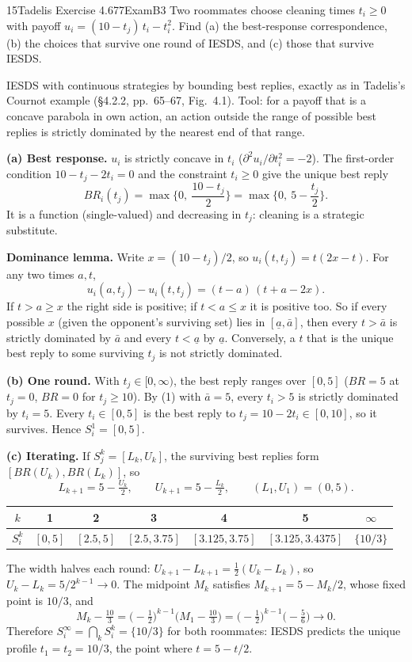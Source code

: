 \begin{exsol}{15}{Tadelis Exercise 4.6}{77}{Exam}{B3}
\asked Two roommates choose cleaning times $t_i \ge 0$ with payoff
$u_i = (10 - t_j)\,t_i - t_i^2$. Find (a) the best-response correspondence, (b) the choices that
survive one round of IESDS, and (c) those that survive IESDS.

\method IESDS with continuous strategies by bounding best replies, exactly as in Tadelis's
Cournot example (\S4.2.2, pp.~65--67, Fig.~4.1). Tool: for a payoff that is a concave parabola
in own action, an action outside the range of possible best replies is strictly dominated by the
nearest end of that range.

\solution
\textbf{(a) Best response.} $u_i$ is strictly concave in $t_i$ ($\partial^2 u_i/\partial t_i^2 = -2$).
The first-order condition $10 - t_j - 2t_i = 0$ and the constraint $t_i \ge 0$ give the unique
best reply
\[
  BR_i(t_j) = \max\Big\{0,\ \frac{10 - t_j}{2}\Big\} = \max\Big\{0,\ 5 - \frac{t_j}{2}\Big\}.
\]
It is a function (single-valued) and decreasing in $t_j$: cleaning is a strategic substitute.

\textbf{Dominance lemma.} Write $x = (10 - t_j)/2$, so $u_i(t, t_j) = t(2x - t)$. For any two
times $a, t$,
\[
  u_i(a, t_j) - u_i(t, t_j) = (t - a)\,(t + a - 2x). \tag{1}
\]
If $t > a \ge x$ the right side is positive; if $t < a \le x$ it is positive too. So if every
possible $x$ (given the opponent's surviving set) lies in $[\underline{a}, \bar a]$, then every
$t > \bar a$ is strictly dominated by $\bar a$ and every $t < \underline{a}$ by $\underline{a}$.
Conversely, a $t$ that is the unique best reply to some surviving $t_j$ is not strictly
dominated.

\textbf{(b) One round.} With $t_j \in [0, \infty)$, the best reply ranges over $[0, 5]$
($BR = 5$ at $t_j = 0$, $BR = 0$ for $t_j \ge 10$). By (1) with $\bar a = 5$, every $t_i > 5$
is strictly dominated by $t_i = 5$. Every $t_i \in [0,5]$ is the best reply to
$t_j = 10 - 2t_i \in [0, 10]$, so it survives. Hence $S_i^1 = [0, 5]$.

\textbf{(c) Iterating.} If $S_j^k = [L_k, U_k]$, the surviving best replies form
$[BR(U_k), BR(L_k)]$, so
\[
  L_{k+1} = 5 - \tfrac{U_k}{2}, \qquad U_{k+1} = 5 - \tfrac{L_k}{2}, \qquad (L_1, U_1) = (0, 5).
\]
\begin{center}
\begin{tabular}{c|cccccc}
$k$ & 1 & 2 & 3 & 4 & 5 & $\infty$ \\ \hline
$S_i^k$ & $[0, 5]$ & $[2.5, 5]$ & $[2.5, 3.75]$ & $[3.125, 3.75]$ & $[3.125, 3.4375]$ & $\{10/3\}$
\end{tabular}
\end{center}
The width halves each round: $U_{k+1} - L_{k+1} = \tfrac12 (U_k - L_k)$, so
$U_k - L_k = 5/2^{k-1} \to 0$. The midpoint $M_k$ satisfies $M_{k+1} = 5 - M_k/2$, whose fixed
point is $10/3$, and
\[
  M_k - \tfrac{10}{3} = \big(-\tfrac12\big)^{k-1}\big(M_1 - \tfrac{10}{3}\big)
  = \big(-\tfrac12\big)^{k-1}\big(-\tfrac56\big) \to 0 .
\]
Therefore $S_i^\infty = \bigcap_k S_i^k = \{10/3\}$ for both roommates: IESDS predicts the
unique profile $t_1 = t_2 = 10/3$, the point where $t = 5 - t/2$.


\end{exsol}
